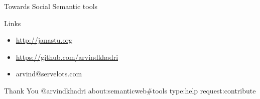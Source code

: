 \documentclass[''urlcolor=red'']{beamer}
\begin{document}
\begin{frame}{Towards Social Semantic tools}
  \begin{block}{Links}
    \begin{itemize}
    \item \url{http://janastu.org}
    \item \url{https://github.com/arvindkhadri}
    \item arvind@servelots.com
    \end{itemize}
  \end{block}
\end{frame}

\begin{frame}{Thank You}
   \center @arvindkhadri about:semanticweb\#tools type:help request:contribute
\end{frame}
\end{document}
